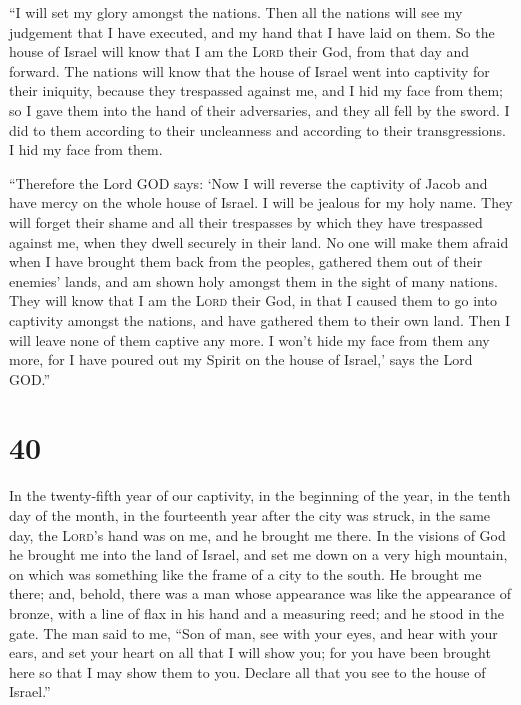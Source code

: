  ``I will set my glory amongst the nations. Then all the
nations will see my judgement that I have executed, and my hand that I
have laid on them.  So the house of Israel will know that
I am the \textsc{Lord} their God, from that day and forward.
 The nations will know that the house of Israel went into
captivity for their iniquity, because they trespassed against me, and I
hid my face from them; so I gave them into the hand of their
adversaries, and they all fell by the sword.  I did to
them according to their uncleanness and according to their
transgressions. I hid my face from them.

 ``Therefore the Lord GOD says: `Now I will reverse the
captivity of Jacob and have mercy on the whole house of Israel. I will
be jealous for my holy name.  They will forget their
shame and all their trespasses by which they have trespassed against me,
when they dwell securely in their land. No one will make them afraid
 when I have brought them back from the peoples, gathered
them out of their enemies' lands, and am shown holy amongst them in the
sight of many nations.  They will know that I am the
\textsc{Lord} their God, in that I caused them to go into captivity
amongst the nations, and have gathered them to their own land. Then I
will leave none of them captive any more.  I won't hide
my face from them any more, for I have poured out my Spirit on the house
of Israel,' says the Lord GOD.''

\hypertarget{section-39}{%
\section{40}\label{section-39}}

 In the twenty-fifth year of our captivity, in the
beginning of the year, in the tenth day of the month, in the fourteenth
year after the city was struck, in the same day, the \textsc{Lord}'s
hand was on me, and he brought me there.  In the visions
of God he brought me into the land of Israel, and set me down on a very
high mountain, on which was something like the frame of a city to the
south.  He brought me there; and, behold, there was a man
whose appearance was like the appearance of bronze, with a line of flax
in his hand and a measuring reed; and he stood in the gate.
 The man said to me, ``Son of man, see with your eyes, and
hear with your ears, and set your heart on all that I will show you; for
you have been brought here so that I may show them to you. Declare all
that you see to the house of Israel.''

